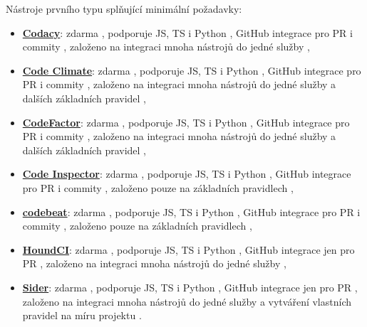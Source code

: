 Nástroje prvního typu splňující minimální požadavky:
\begin{itemize}
    \item \href{https://www.codacy.com}{\textbf{Codacy}}: zdarma \cite{codacy-pricing}, podporuje JS, TS i Python \cite{codacy-langs}, GitHub integrace pro PR i commity \cite{codacy-gh}, založeno na integraci mnoha nástrojů do jedné služby \cite{codacy-engines},
    \item \href{https://codeclimate.com}{\textbf{Code Climate}}: zdarma \cite{codeclimate-pricing}, podporuje JS, TS i Python \cite{codeclimate}, GitHub integrace pro PR i commity \cite{codeclimate-gh}, založeno na integraci mnoha nástrojů do jedné služby a dalších základních pravidel \cite{codeclimate-engines},
    \item \href{https://www.codefactor.io}{\textbf{CodeFactor}}: zdarma \cite{codefactor-pricing}, podporuje JS, TS i Python \cite{codefactor}, GitHub integrace pro PR i commity \cite{codefactor}, založeno na integraci mnoha nástrojů do jedné služby a dalších základních pravidel \cite{codefactor-engines},
    \item \href{https://www.code-inspector.com}{\textbf{Code Inspector}}: zdarma \cite{codeinspector-pricing}, podporuje JS, TS i Python \cite{codeinspector}, GitHub integrace pro PR i commity \cite{codeinspector}, založeno pouze na základních pravidlech \cite{codeinspector, codeinspector-engines},
    \item \href{https://codebeat.co}{\textbf{codebeat}}: zdarma \cite{codebeat-pricing}, podporuje JS, TS i Python \cite{codebeat}, GitHub integrace pro PR i commity \cite{codebeat}, založeno pouze na základních pravidlech \cite{codebeat-engines},
    \item \href{https://houndci.com}{\textbf{HoundCI}}: zdarma \cite{houndci}, podporuje JS, TS i Python \cite{houndci}, GitHub integrace jen pro PR \cite{houndci}, založeno na integraci mnoha nástrojů do jedné služby \cite{houndci-engines},
    \item \href{https://sider.review}{\textbf{Sider}}: zdarma \cite{sider-pricing}, podporuje JS, TS i Python \cite{sider-engines}, GitHub integrace jen pro PR \cite{sider}, založeno na integraci mnoha nástrojů do jedné služby a vytváření vlastních pravidel na míru projektu \cite{sider-engines}.
\end{itemize}

